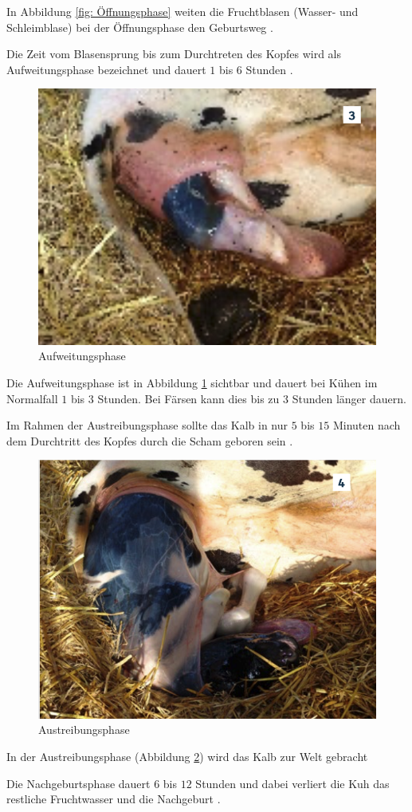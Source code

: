 In Abbildung \ref{fig: Öffnungsphase} weiten die Fruchtblasen (Wasser- und Schleimblase) bei der Öffnungsphase den Geburtsweg \citep[S. 7 ]{Traulsen2013}. 

Die Zeit vom Blasensprung bis zum Durchtreten des Kopfes wird als Aufweitungsphase bezeichnet und dauert $1$ bis $6$ Stunden \citep[S. 7 ]{Traulsen2013}. 
\begin{figure}[H]
	\center
	\includegraphics[scale=.45]{Grafiken/aufweitungsphase.png}
	\caption{ Aufweitungsphase }
	\label{fig: Aufweitungsphase}
\end{figure} 

Die Aufweitungsphase ist in Abbildung \ref{fig: Aufweitungsphase} sichtbar und dauert bei Kühen im Normalfall $1$ bis $3$ Stunden. Bei Färsen kann dies bis zu $3$ Stunden länger dauern. \citep[S. 7 ]{Traulsen2013}

Im Rahmen der Austreibungsphase sollte das Kalb in nur $5$ bis $15$ Minuten nach dem Durchtritt des Kopfes durch die Scham geboren sein \citep[S. 8 ]{Traulsen2013}.  


\begin{figure}[H]
	\center
	\includegraphics[scale=.45]{Grafiken/austreibungsphase.png}
	\caption{Austreibungsphase}
	\label{fig: Austreibungsphase}
\end{figure}

 In der Austreibungsphase (Abbildung \ref{fig: Austreibungsphase}) wird das Kalb zur Welt gebracht \citep[S. 8 ]{Traulsen2013}

Die Nachgeburtsphase dauert $6$ bis $12$ Stunden und dabei verliert die Kuh das restliche Fruchtwasser und die Nachgeburt \citep[S. 8 ]{Traulsen2013}.  
